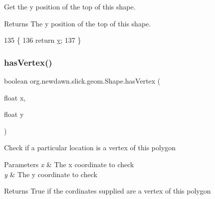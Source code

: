 Get the y position of the top of this shape.

\begin{DoxyReturn}{Returns}
The y position of the top of this shape. 
\end{DoxyReturn}

\begin{DoxyCode}
135                         \{
136         \textcolor{keywordflow}{return} \mbox{\hyperlink{classorg_1_1newdawn_1_1slick_1_1geom_1_1_shape_a9f934baded6a1b65ebb69e7e5f80ea00}{y}};
137     \}
\end{DoxyCode}
\mbox{\label{classorg_1_1newdawn_1_1slick_1_1geom_1_1_shape_a105620e33df143f9ca9b35ecb9c5d324}} 
\subsubsection{\texorpdfstring{has\+Vertex()}{hasVertex()}}
{\footnotesize\ttfamily boolean org.\+newdawn.\+slick.\+geom.\+Shape.\+has\+Vertex (\begin{DoxyParamCaption}\item[{float}]{x,  }\item[{float}]{y }\end{DoxyParamCaption})\hspace{0.3cm}{\ttfamily [inline]}}

Check if a particular location is a vertex of this polygon


\begin{DoxyParams}{Parameters}
{\em x} & The x coordinate to check \\
\hline
{\em y} & The y coordinate to check \\
\hline
\end{DoxyParams}
\begin{DoxyReturn}{Returns}
True if the cordinates supplied are a vertex of this polygon 
\end{DoxyReturn}

